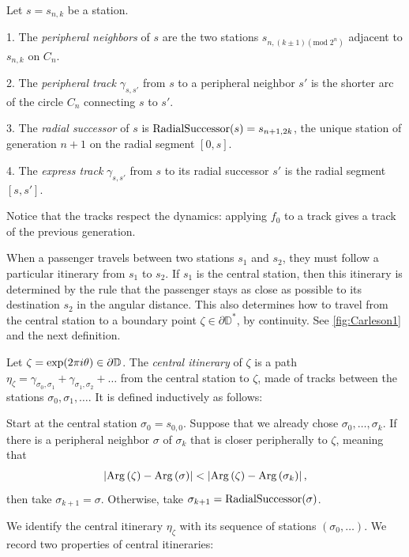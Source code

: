\begin{definition}
Let $s=s_{n,k}$ be a station.

1. The \emph{peripheral neighbors} of $s$ are the two stations $s_{n,\left(k\pm1\right) (\mathrm{mod}\; 2^{n})}$ adjacent to $s_{n,k}$ on $C_{n}$.

2. The \emph{peripheral track }$\gamma_{s,s'}$ from $s$ to a peripheral neighbor $s'$
is the shorter arc of the circle $C_{n}$ connecting $s$ to $s'$.

3. The \emph{radial successor} of $s$ is $\operatorname{RadialSuccessor}(s)=s_{n+1,2k}$, the unique station of generation $n+1$ on the radial segment $[0,s]$.

4. The \emph{express track} $\gamma_{s,s'}$ from $s$ to its radial successor $s'$ is the radial segment $[s,s']$.
\end{definition}
Notice that the tracks respect the dynamics: applying $f_0$ to a track gives a track of the previous generation.

When a passenger travels between two stations $s_1$ and $s_2$, they must follow a particular itinerary from $s_1$ to $s_2$.
If $s_1$ is the central station, then this itinerary is determined by the rule that the passenger stays as close as possible to its destination $s_2$ in the angular distance.
This also determines how to travel from the central station to a boundary point $\zeta\in \partial \mathbb D^*$, by continuity. 
See \cref{fig:Carleson1} and the next definition.


\begin{definition}
Let $\zeta=\exp(2\pi i\theta)\in\partial\mathbb{D}$. 
The \emph{central itinerary} of $\zeta$ is a path 
$\eta_\zeta = \gamma _{\sigma_0,\sigma_1} + \gamma_{\sigma_1,\sigma_2}+\ldots$ 
from the central station to $\zeta$, made of tracks between the stations 
$\sigma_0,\sigma_1,\ldots$. It is defined inductively as follows:

Start at the central station $\sigma_0=s_{0,0}$. Suppose that we already chose $\sigma_0,\ldots,\sigma_k$. If there is a peripheral neighbor $\sigma$ of $\sigma_k$ that is closer peripherally to $\zeta$, meaning that
$$
\left|\operatorname{Arg}\left(\zeta\right)-\operatorname{Arg}\left(\sigma\right)\right|
< \left|\operatorname{Arg}\left(\zeta\right)-\operatorname{Arg}\left(\sigma_{k}\right)\right|,
$$
then take $\sigma_{k+1}=\sigma$. Otherwise, take $\sigma_{k+1}=\operatorname{RadialSuccessor}(\sigma)$.
\end{definition}



We identify the central itinerary $\eta_{\zeta}$ with its sequence of stations $(\sigma_0,\ldots)$. We record two properties of central itineraries:

